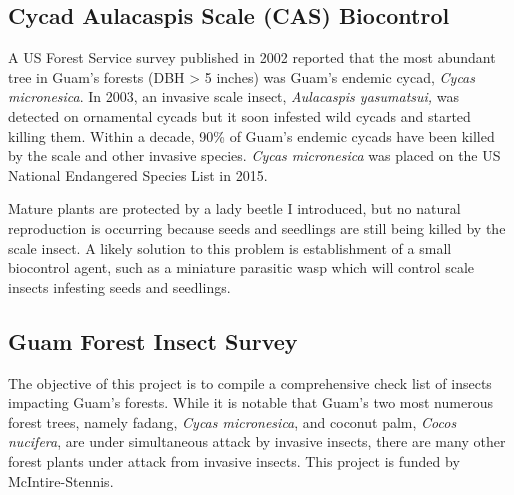 \documentclass[12pt,english]{scrartcl}
\begin{document}
\subsection{Cycad Aulacaspis Scale (CAS) Biocontrol}

A US Forest Service survey published in 2002 reported that the most
abundant tree in Guam's forests (DBH > 5 inches) was Guam's endemic
cycad, \emph{Cycas micronesica}. In 2003, an invasive scale insect,
\emph{Aulacaspis yasumatsui,} was detected on ornamental cycads but
it soon infested wild cycads and started killing them. Within a decade,
90\% of Guam\textquoteright s endemic cycads have been killed by the
scale and other invasive species. \emph{Cycas micronesica} was placed
on the US National Endangered Species List in 2015.

Mature plants are protected by a lady beetle I introduced, but no
natural reproduction is occurring because seeds and seedlings are
still being killed by the scale insect. A likely solution to this
problem is establishment of a small biocontrol agent, such as a miniature
parasitic wasp which will control scale insects infesting seeds and
seedlings.

\begin{comment}

\raggedright\vspace{2mm}\textbf{Activity}
\begin{itemize}
\item Worked with Ben DeLoso, Tom Marler's grad student, to perform a CAS
parasitoid survey \cite{deloso2018parasitoid}. 
\end{itemize}
\raggedright\vspace{2mm}\textbf{Reference(s)}

\begin{btSect}[vancouver]{zotero}
\btPrintCited
\end{btSect}
\newpage{}
\end{btUnit}

\begin{btUnit}

\end{comment}

\subsection{Guam Forest Insect Survey}

The objective of this project is to compile a comprehensive check
list of insects impacting Guam's forests. While it is notable that
Guam's two most numerous forest trees, namely fadang, \emph{Cycas
micronesica}, and coconut palm, \emph{Cocos nucifera}, are under simultaneous
attack by invasive insects, there are many other forest plants under
attack from invasive insects. This project is funded by McIntire-Stennis.
\end{document}
